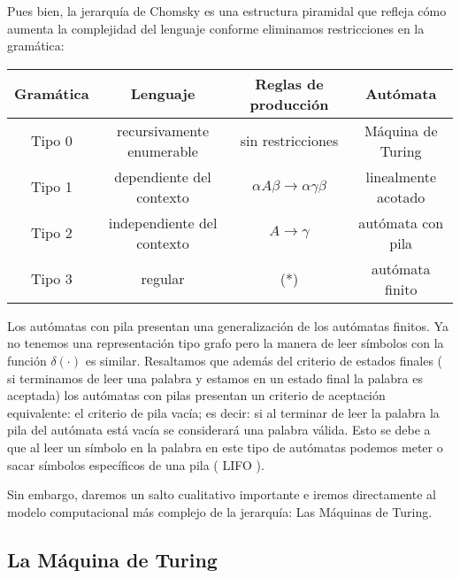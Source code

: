 \vspace{10px}

Pues bien, la jerarquía de Chomsky es una estructura piramidal que refleja cómo aumenta la complejidad del lenguaje conforme eliminamos restricciones en la gramática:

\vspace{1cm}


\begin{center}
	\begin{tabular}{|c|c|c|c|}
		\hline 
		Gramática & Lenguaje  &Reglas de producción   & Autómata  \\ 
		\hline 
		Tipo 0	& recursivamente enumerable  & sin restricciones  & Máquina de Turing  \\ 
		\hline 
		Tipo 1	& dependiente del contexto  & $\alpha A \beta \rightarrow \alpha \gamma \beta$ & linealmente acotado  \\ 
		\hline 
		Tipo 2	& independiente del contexto  & $A \rightarrow \gamma $  & autómata con pila   \\ 
		\hline 
		Tipo 3	& regular  & (*) & autómata finito \\
		\hline 
	\end{tabular} 
\end{center}

\vspace{1cm}

Los autómatas con pila presentan una generalización de los autómatas finitos. Ya no tenemos una representación tipo grafo pero la manera de leer símbolos con la función $\delta(\cdot)$ es similar. Resaltamos que además del criterio de estados finales ( si terminamos de leer una palabra y estamos en un estado final la palabra es aceptada) los autómatas con pilas presentan un criterio de aceptación equivalente: el criterio de pila vacía; es decir: si al terminar de leer la palabra la pila del autómata está vacía se considerará una palabra válida. Esto se debe a que al leer un símbolo en la palabra en este tipo de autómatas podemos meter o sacar símbolos específicos de una pila ( LIFO ).

\vspace{10px}

Sin embargo, daremos un salto cualitativo importante e iremos directamente al modelo computacional más complejo de la jerarquía: Las Máquinas de Turing.



\subsection{La Máquina de Turing}

